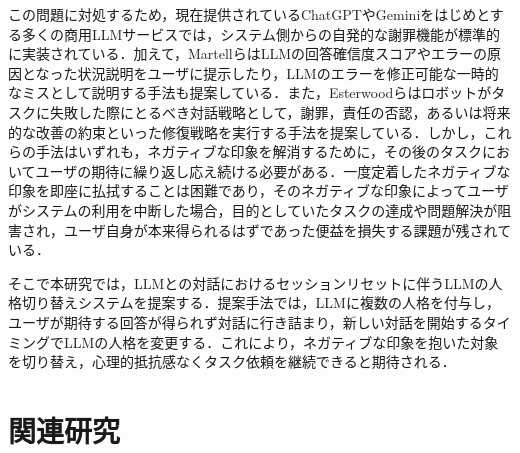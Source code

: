 \documentclass[10pt,twocolumn]{jsarticle}
\begin{document}
この問題に対処するため，現在提供されているChatGPTやGeminiをはじめとする多くの商用LLMサービスでは，システム側からの自発的な謝罪機能が標準的に実装されている．加えて，Martellら\cite{Martell2025}はLLMの回答確信度スコアやエラーの原因となった状況説明をユーザに提示したり，LLMのエラーを修正可能な一時的なミスとして説明する手法も提案している．また，Esterwoodら\cite{Esterwood2023}はロボットがタスクに失敗した際にとるべき対話戦略として，謝罪，責任の否認，あるいは将来的な改善の約束といった修復戦略を実行する手法を提案している．しかし，これらの手法はいずれも，ネガティブな印象を解消するために，その後のタスクにおいてユーザの期待に繰り返し応え続ける必要がある．一度定着したネガティブな印象を即座に払拭することは困難であり，そのネガティブな印象によってユーザがシステムの利用を中断した場合，目的としていたタスクの達成や問題解決が阻害され，ユーザ自身が本来得られるはずであった便益を損失する課題が残されている．



そこで本研究では，LLMとの対話におけるセッションリセットに伴うLLMの人格切り替えシステムを提案する．提案手法では，LLMに複数の人格を付与し，ユーザが期待する回答が得られず対話に行き詰まり，新しい対話を開始するタイミングでLLMの人格を変更する．これにより，ネガティブな印象を抱いた対象を切り替え，心理的抵抗感なくタスク依頼を継続できると期待される．

\section{関連研究}
\end{document}
